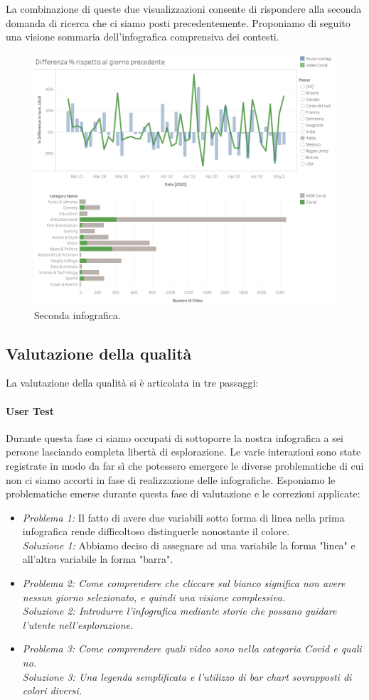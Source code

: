 \documentclass[10pt, a4paper,openany]{article}
\begin{document}
La combinazione di queste due visualizzazioni consente di rispondere alla seconda domanda di ricerca che ci siamo posti precedentemente. Proponiamo di seguito una visione sommaria dell'infografica comprensiva dei contesti.

\begin{figure}[H]
	\centering
	\includegraphics[height=0.5 \linewidth]{pics/seconda_infografica.png}
	\caption{Seconda infografica.}
\end{figure}
\subsection*{Valutazione della qualità}
La valutazione della qualità si è articolata in tre passaggi:

\paragraph{User Test} Durante questa fase ci siamo occupati di sottoporre la nostra infografica a sei persone lasciando completa libertà di esplorazione. Le varie interazioni sono state registrate in modo da far sì che potessero emergere le diverse problematiche di cui non ci siamo accorti in fase di realizzazione delle infografiche. Esponiamo le problematiche emerse durante questa fase di valutazione e le correzioni applicate:

\begin{itemize}
	\item \textit{Problema 1:} Il fatto di avere due variabili sotto forma di linea nella prima infografica rende difficoltoso distinguerle nonostante il colore.\\\textit{Soluzione 1:} Abbiamo deciso di assegnare ad una variabile la forma "linea" e all'altra variabile la forma "barra".
	\item  \textit{Problema 2: Come comprendere che cliccare sul bianco significa non avere nessun giorno selezionato, e quindi una visione complessiva.}\\\textit{Soluzione 2: Introdurre l'infografica mediante storie che possano guidare l'utente nell'esplorazione.} 
	\item  \textit{Problema 3: Come comprendere quali video sono nella categoria Covid e quali no.} \\\textit{Soluzione 3: Una legenda semplificata e l'utilizzo di bar chart sovrapposti di colori diversi.} 
\end{itemize}
\end{document}

